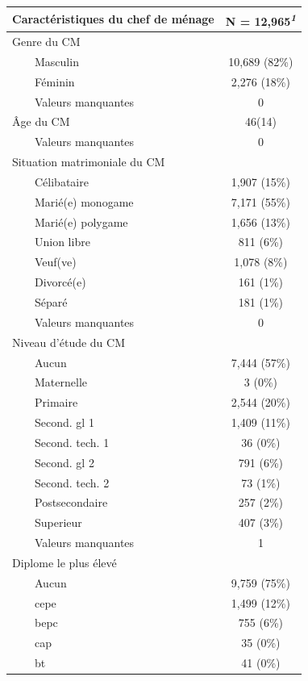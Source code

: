\documentclass[
]{article}
\begin{document}
\begin{table}[!t]
\fontsize{12.0pt}{14.4pt}\selectfont
\begin{tabular*}{\linewidth}{@{\extracolsep{\fill}}lc}
\toprule
Caractéristiques du chef de ménage & \textbf{N = 12,965}\textsuperscript{\textit{1}} \\ 
\midrule\addlinespace[2.5pt]
Genre du CM &  \\ 
    Masculin & 10,689 (82\%) \\ 
    Féminin & 2,276 (18\%) \\ 
    Valeurs manquantes & 0 \\ 
Âge du CM & 46(14) \\ 
    Valeurs manquantes & 0 \\ 
Situation matrimoniale du CM &  \\ 
    Célibataire & 1,907 (15\%) \\ 
    Marié(e) monogame & 7,171 (55\%) \\ 
    Marié(e) polygame & 1,656 (13\%) \\ 
    Union libre & 811 (6\%) \\ 
    Veuf(ve) & 1,078 (8\%) \\ 
    Divorcé(e) & 161 (1\%) \\ 
    Séparé & 181 (1\%) \\ 
    Valeurs manquantes & 0 \\ 
Niveau d'étude du CM &  \\ 
    Aucun & 7,444 (57\%) \\ 
    Maternelle & 3 (0\%) \\ 
    Primaire & 2,544 (20\%) \\ 
    Second. gl 1 & 1,409 (11\%) \\ 
    Second. tech. 1 & 36 (0\%) \\ 
    Second. gl 2 & 791 (6\%) \\ 
    Second. tech. 2 & 73 (1\%) \\ 
    Postsecondaire & 257 (2\%) \\ 
    Superieur & 407 (3\%) \\ 
    Valeurs manquantes & 1 \\ 
Diplome le plus élevé &  \\ 
    Aucun & 9,759 (75\%) \\ 
    cepe & 1,499 (12\%) \\ 
    bepc & 755 (6\%) \\ 
    cap & 35 (0\%) \\ 
    bt & 41 (0\%) \\ 

\end{tabular*}
\end{table}
\end{document}
